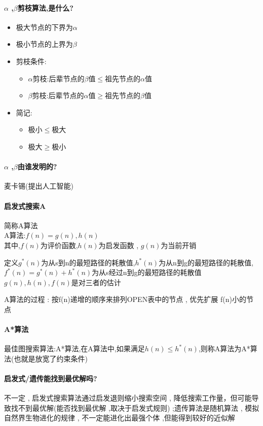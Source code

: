 \documentclass[UTF8,a4paper]{ctexart}
\begin{document}
\paragraph{$\alpha$ ,$\beta$剪枝算法,是什么?}
\begin{itemize}
	\item 极大节点的下界为$\alpha$
	\item 极小节点的上界为$\beta$
	\item 剪枝条件:
	      \begin{itemize}
		      \item $\alpha$剪枝:后辈节点的$\beta$值$\leq$祖先节点的$\alpha$值
		      \item $\beta$剪枝:后辈节点的$\alpha$值$\geq$祖先节点的$\beta$值
	      \end{itemize}
	\item 简记:
	      \begin{itemize}
		      \item 极小$\leq$极大
		      \item 极大$\geq$极小
	      \end{itemize}
\end{itemize}

\paragraph{$\alpha$ ,$\beta$由谁发明的?}麦卡锡(提出人工智能)

\paragraph{启发式搜索A} 简称A算法\\
A算法:$f(n) = g(n) , h(n)$\\
其中,$f(n)$为评价函数,$h(n)$为启发函数 , $g(n)$为当前开销

定义$g^*(n)$为从s到n的最短路径的耗散值,$h^*(n)$为从n到g的最短路径的耗散值,$f^*(n) = g^*(n) + h^*(n)$为从s经过n到g的最短路径的耗散值\\
$g(n) , h(n) , f(n)$是对三者的估计

A算法的过程 : 按f(n)递增的顺序来排列OPEN表中的节点 , 优先扩展 f(n)小的节点

\paragraph{A*算法}
最佳图搜索算法:A*算法,在A算法中,如果满足$h(n) \leq h^*(n)$,则称A算法为A*算法(也就是放宽了约束条件)

\paragraph{启发式/遗传能找到最优解吗?}
不一定 , 启发式搜索算法通过启发退则缩小搜索空间 , 降低搜索工作量，但可能导致找不到最优解(能否找到最优解 ,取决于启发式规则) ;遗传算法是随机算法 , 模拟自然界生物进化的规律 , 不一定能进化出最强个体 ,但能得到较好的近似解
\end{document}
